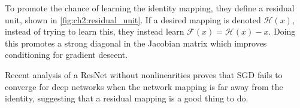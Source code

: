   To promote the chance of learning the identity mapping, they define a residual
  unit, shown in \autoref{fig:ch2:residual_unit}. If a desired mapping is
  denoted $\mathcal{H}(x)$, instead of trying to learn this, they instead learn
  $\mathcal{F}(x) = \mathcal{H}(x) - x$. Doing this promotes a strong diagonal
  in the Jacobian matrix which improves conditioning for gradient descent.

  Recent analysis of a ResNet without nonlinearities
  \cite{bartlett_representing_2018, bartlett_gradient_2018} proves that SGD
  fails to converge for deep networks when the network mapping is far away from
  the identity, suggesting that a residual mapping is a good thing to do.
